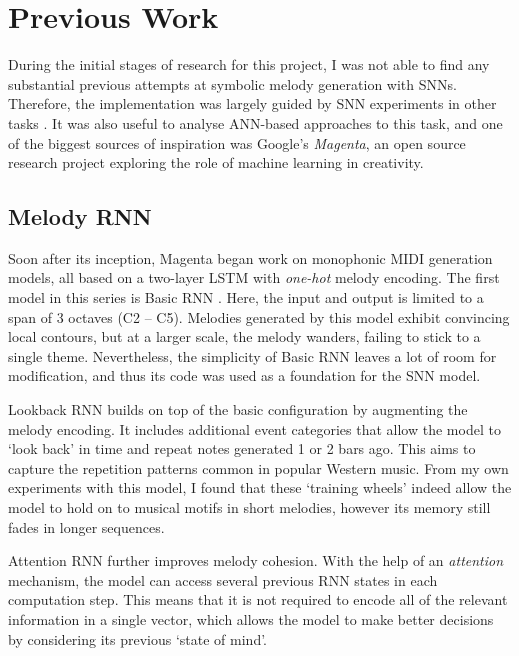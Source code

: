 \documentclass[../../report.tex]{subfiles}
\begin{document}
\section{Previous Work}

During the initial stages of research for this project, I was not able to find
any substantial previous attempts at symbolic melody generation with SNNs.
Therefore, the implementation was largely guided by SNN experiments in other
tasks \cite{Bellec2020, Bellec2018LSNN}. It was also useful to analyse ANN-based
approaches to this task, and one of the biggest sources of inspiration was
Google's \emph{Magenta}, an open source research project exploring the role of
machine learning in creativity.

\subsection{Melody RNN}

Soon after its inception, Magenta began work on monophonic MIDI generation
models, all based on a two-layer LSTM with \emph{one-hot}\footnotemark{} melody
encoding. The first model in this series is Basic RNN \cite{Abolafia2016}. Here,
the input and output is limited to a span of 3 octaves (C2 -- C5). Melodies
generated by this model exhibit convincing local contours, but at a larger
scale, the melody wanders, failing to stick to a single theme. Nevertheless, the
simplicity of Basic RNN leaves a lot of room for modification, and thus its code
was used as a foundation for the SNN model.


Lookback RNN \cite{Waite2016} builds on top of the basic configuration by
augmenting the melody encoding. It includes additional event categories that
allow the model to `look back' in time and repeat notes generated 1 or 2 bars
ago. This aims to capture the repetition patterns common in popular Western
music. From my own experiments with this model, I found that these `training
wheels' indeed allow the model to hold on to musical motifs in short melodies,
however its memory still fades in longer sequences.

Attention RNN \cite{Waite2016} further improves melody cohesion. With the help
of an \emph{attention} mechanism, the model can access several previous RNN
states in each computation step. This means that it is not required to encode
all of the relevant information in a single vector, which allows the model to
make better decisions by considering its previous `state of mind'.
\end{document}
